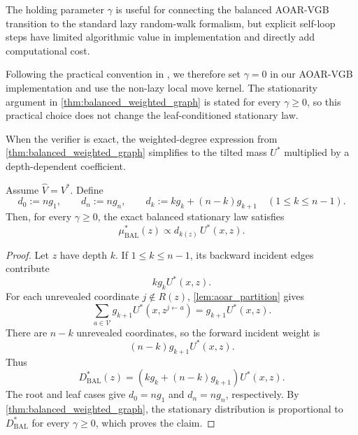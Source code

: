 \documentclass{article}
\numberwithin{theorem}{section}
\numberwithin{proposition}{section}
\numberwithin{corollary}{section}
\numberwithin{lemma}{section}
\numberwithin{conjecture}{section}
\numberwithin{remark}{section}
\numberwithin{definition}{section}
\numberwithin{assumption}{section}
\numberwithin{example}{section}
\newcommand{\calV}{{\mathcal{V}}}
\newcommand{\sbra}[1]{\left(#1\right)}
\begin{document}
\begin{remark}
\label{rem:balanced_gamma_zero}
\quad The holding parameter $\gamma$ is useful for connecting the balanced AOAR-VGB transition to the standard lazy random-walk formalism, but explicit self-loop steps have limited algorithmic value in implementation and directly add computational cost.

Following the practical convention in \citet{rohatgi2025taming}, we therefore set $\gamma=0$ in our AOAR-VGB implementation and use the non-lazy local move kernel. The stationarity argument in \cref{thm:balanced_weighted_graph} is stated for every $\gamma\ge 0$, so this practical choice does not change the leaf-conditioned stationary law.
\end{remark}

When the verifier is exact, the weighted-degree expression from \cref{thm:balanced_weighted_graph} simplifies to the tilted mass $U^*$ multiplied by a depth-dependent coefficient.

\begin{corollary}
\label{cor:balanced_exact_stationary}
Assume $\widehat V=V^*$. Define
\begin{equation*}
    d_0:=n g_1, \qquad d_n:=n g_n, \qquad
    d_k := k g_k+(n-k)g_{k+1}\quad (1\le k\le n-1).
\end{equation*}
Then, for every $\gamma\ge 0$, the exact balanced stationary law satisfies
\begin{equation*}
    \mu_{\mathrm{BAL}}^*(z) \propto d_{k(z)}\,U^*(x,z).
\end{equation*}
\end{corollary}

\begin{proof}
Let $z$ have depth $k$. If $1\le k\le n-1$, its backward incident edges contribute
\begin{equation*}
    k g_k U^*(x,z).
\end{equation*}
For each unrevealed coordinate $j\notin R(z)$, \cref{lem:aoar_partition} gives
\begin{equation*}
    \sum_{a\in\calV} g_{k+1}U^*(x,z^{j\leftarrow a}) = g_{k+1}U^*(x,z).
\end{equation*}
There are $n-k$ unrevealed coordinates, so the forward incident weight is
\begin{equation*}
    (n-k)g_{k+1}U^*(x,z).
\end{equation*}
Thus
\begin{equation*}
    D_{\mathrm{BAL}}^*(z)=\sbra{k g_k+(n-k)g_{k+1}}U^*(x,z).
\end{equation*}
The root and leaf cases give $d_0=n g_1$ and $d_n=n g_n$, respectively. By \cref{thm:balanced_weighted_graph}, the stationary distribution is proportional to $D_{\mathrm{BAL}}^*$ for every $\gamma\ge 0$, which proves the claim.
\end{proof}
\end{document}
